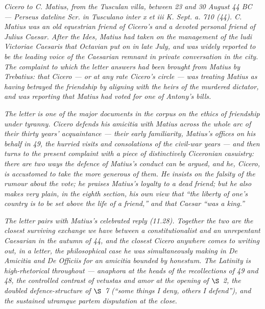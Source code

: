 
\textit{Cicero to C. Matius, from the Tusculan villa,
between 23 and 30 August 44 BC --- Perseus dateline
\textit{Scr. in Tusculano inter x et iii K. Sept. a. 710
(44)}. C. Matius was an old equestrian friend of Cicero's
and a devoted personal friend of Julius Caesar. After the
Ides, Matius had taken on the management of the
\textit{ludi Victoriae Caesaris} that Octavian put on in
late July, and was widely reported to be the leading voice
of the Caesarian remnant in private conversation in the
city. The complaint to which the letter answers had been
brought from Matius by Trebatius: that Cicero --- or at
any rate Cicero's circle --- was treating Matius as having
betrayed the friendship by aligning with the heirs of the
murdered dictator, and was reporting that Matius had voted
for one of Antony's bills.}

\textit{The letter is one of the major documents in the
corpus on the ethics of friendship under tyranny. Cicero
defends his amicitia with Matius across the whole arc of
their thirty years' acquaintance --- their early
familiarity, Matius's offices on his behalf in 49, the
hurried visits and consolations of the civil-war
years --- and then turns to the present complaint with a
piece of distinctively Ciceronian casuistry: there are two
ways the defence of Matius's conduct can be argued, and
he, Cicero, is accustomed to take the more generous of
them. He insists on the falsity of the rumour about the
vote; he praises Matius's loyalty to a dead friend; but
he also makes very plain, in the eighth section, his own
view that ``the liberty of one's country is to be set
above the life of a friend,'' and that Caesar ``was a
king.''}

\textit{The letter pairs with Matius's celebrated reply
(11.28). Together the two are the closest surviving
exchange we have between a constitutionalist and an
unrepentant Caesarian in the autumn of 44, and the closest
Cicero anywhere comes to writing out, in a letter, the
philosophical case he was simultaneously making in
\textit{De Amicitia} and \textit{De Officiis} for an
\textit{amicitia} bounded by \textit{honestum}. The
Latinity is high-rhetorical throughout --- anaphora at the
heads of the recollections of 49 and 48, the controlled
contrast of \textit{vetustas} and \textit{amor} at the
opening of $\S$~2, the doubled defence-structure of
$\S$~7 (``some things I deny, others I defend''), and the
sustained \textit{utramque partem} disputation at the
close.}
